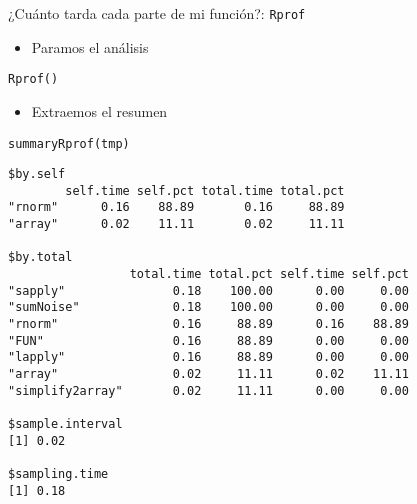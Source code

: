 \documentclass[xcolor={usenames,svgnames,dvipsnames}]{beamer}
\begin{document}
\begin{frame}[fragile,label={sec:orgheadline26}]{¿Cuánto tarda cada parte de mi función?: \texttt{Rprof}}
 \begin{itemize}
\item Paramos el análisis
\end{itemize}
\lstset{language=R,label= ,caption= ,captionpos=b,numbers=none}
\begin{lstlisting}
Rprof()
\end{lstlisting}

\begin{itemize}
\item Extraemos el resumen
\end{itemize}
\lstset{language=R,label= ,caption= ,captionpos=b,numbers=none}
\begin{lstlisting}
summaryRprof(tmp)
\end{lstlisting}

\begin{verbatim}
$by.self
        self.time self.pct total.time total.pct
"rnorm"      0.16    88.89       0.16     88.89
"array"      0.02    11.11       0.02     11.11

$by.total
                 total.time total.pct self.time self.pct
"sapply"               0.18    100.00      0.00     0.00
"sumNoise"             0.18    100.00      0.00     0.00
"rnorm"                0.16     88.89      0.16    88.89
"FUN"                  0.16     88.89      0.00     0.00
"lapply"               0.16     88.89      0.00     0.00
"array"                0.02     11.11      0.02    11.11
"simplify2array"       0.02     11.11      0.00     0.00

$sample.interval
[1] 0.02

$sampling.time
[1] 0.18
\end{verbatim}
\end{frame}
\end{document}
